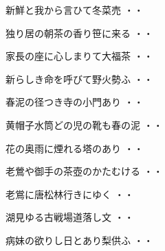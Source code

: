 \vspace{0.6cm}
\begin{shiika}新鮮と我から言ひて冬菜売
\hfill{・・}\end{shiika}
\vspace{0.6cm}
\begin{shiika}独り居の朝茶の香り笹に来る
\hfill{・・}\end{shiika}
\vspace{0.6cm}
\begin{shiika}家長の座に心しまりて大福茶
\hfill{・・}\end{shiika}
\vspace{0.6cm}
\begin{shiika}新らしき命を呼びて野火勢ふ
\hfill{・・}\end{shiika}
\vspace{0.6cm}
\begin{shiika}春泥の径つき寺の小門あり
\hfill{・・}\end{shiika}
\vspace{0.6cm}
\begin{shiika}黄帽子水筒どの児の靴も春の泥
\hfill{・・}\end{shiika}
\vspace{0.6cm}
\begin{shiika}花の奥雨に煙れる塔のあり
\hfill{・・}\end{shiika}
\vspace{0.6cm}
\begin{shiika}老鶯や御手の茶壺のかたむける
\hfill{・・}\end{shiika}
\vspace{0.6cm}
\begin{shiika}老鴬に唐松林行きにゆく
\hfill{・・}\end{shiika}
\vspace{0.6cm}
\begin{shiika}湖見ゆる古戦場道落し文
\hfill{・・}\end{shiika}
\vspace{0.6cm}
\begin{shiika}病妹の欲りし日とあり梨供ふ
\hfill{・・}\end{shiika}
